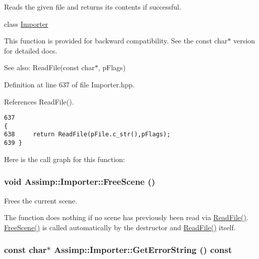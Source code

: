 Reads the given file and returns its contents if successful. 

class \hyperlink{class_assimp_1_1_importer}{Importer}

This function is provided for backward compatibility. See the const char$\ast$ version for detailed docs. \begin{Desc}
\item[See also:]ReadFile(const char$\ast$, pFlags) \end{Desc}


Definition at line 637 of file Importer.hpp.

References ReadFile().

\begin{Code}\begin{verbatim}637                                                                                             {
638     return ReadFile(pFile.c_str(),pFlags);
639 }
\end{verbatim}
\end{Code}




Here is the call graph for this function:\hypertarget{class_assimp_1_1_importer_53dafc3046abc33365a07c605716c5d4}{
\subsubsection[FreeScene]{\setlength{\rightskip}{0pt plus 5cm}void Assimp::Importer::FreeScene ()}}
\label{class_assimp_1_1_importer_53dafc3046abc33365a07c605716c5d4}


Frees the current scene.

The function does nothing if no scene has previously been read via \hyperlink{class_assimp_1_1_importer_174418ab41d5b8bc51a044895cb991e5}{ReadFile()}. \hyperlink{class_assimp_1_1_importer_53dafc3046abc33365a07c605716c5d4}{FreeScene()} is called automatically by the destructor and \hyperlink{class_assimp_1_1_importer_174418ab41d5b8bc51a044895cb991e5}{ReadFile()} itself. \hypertarget{class_assimp_1_1_importer_23bab5ba8cb9b6886c690a610766668b}{
\subsubsection[GetErrorString]{\setlength{\rightskip}{0pt plus 5cm}const char$\ast$ Assimp::Importer::GetErrorString () const}}
\label{class_assimp_1_1_importer_23bab5ba8cb9b6886c690a610766668b}


